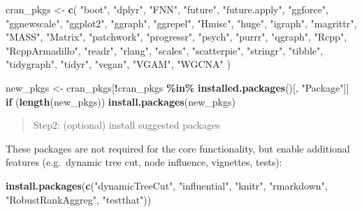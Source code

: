 \documentclass[
]{book}
\newenvironment{Shaded}{\begin{snugshade}}{\end{snugshade}}
\newcommand{\ControlFlowTok}[1]{\textcolor[rgb]{0.13,0.29,0.53}{\textbf{#1}}}
\newcommand{\FunctionTok}[1]{\textcolor[rgb]{0.13,0.29,0.53}{\textbf{#1}}}
\newcommand{\NormalTok}[1]{#1}
\newcommand{\OtherTok}[1]{\textcolor[rgb]{0.56,0.35,0.01}{#1}}
\newcommand{\SpecialCharTok}[1]{\textcolor[rgb]{0.81,0.36,0.00}{\textbf{#1}}}
\newcommand{\StringTok}[1]{\textcolor[rgb]{0.31,0.60,0.02}{#1}}
\begin{document}
\begin{Shaded}
\begin{Highlighting}[]
\NormalTok{cran\_pkgs }\OtherTok{\textless{}{-}} \FunctionTok{c}\NormalTok{(}
  \StringTok{"boot"}\NormalTok{, }\StringTok{"dplyr"}\NormalTok{, }\StringTok{"FNN"}\NormalTok{, }\StringTok{"future"}\NormalTok{, }\StringTok{"future.apply"}\NormalTok{,}
  \StringTok{"ggforce"}\NormalTok{, }\StringTok{"ggnewscale"}\NormalTok{, }\StringTok{"ggplot2"}\NormalTok{, }\StringTok{"ggraph"}\NormalTok{, }\StringTok{"ggrepel"}\NormalTok{,}
  \StringTok{"Hmisc"}\NormalTok{, }\StringTok{"huge"}\NormalTok{, }\StringTok{"igraph"}\NormalTok{, }\StringTok{"magrittr"}\NormalTok{, }\StringTok{"MASS"}\NormalTok{,}
  \StringTok{"Matrix"}\NormalTok{, }\StringTok{"patchwork"}\NormalTok{, }\StringTok{"progressr"}\NormalTok{, }\StringTok{"psych"}\NormalTok{, }\StringTok{"purrr"}\NormalTok{,}
  \StringTok{"qgraph"}\NormalTok{, }\StringTok{"Rcpp"}\NormalTok{, }\StringTok{"RcppArmadillo"}\NormalTok{, }\StringTok{"readr"}\NormalTok{, }\StringTok{"rlang"}\NormalTok{,}
  \StringTok{"scales"}\NormalTok{, }\StringTok{"scatterpie"}\NormalTok{, }\StringTok{"stringr"}\NormalTok{, }\StringTok{"tibble"}\NormalTok{, }\StringTok{"tidygraph"}\NormalTok{,}
  \StringTok{"tidyr"}\NormalTok{, }\StringTok{"vegan"}\NormalTok{, }\StringTok{"VGAM"}\NormalTok{, }\StringTok{"WGCNA"}
\NormalTok{)}

\NormalTok{new\_pkgs }\OtherTok{\textless{}{-}}\NormalTok{ cran\_pkgs[}\SpecialCharTok{!}\NormalTok{cran\_pkgs }\SpecialCharTok{\%in\%} \FunctionTok{installed.packages}\NormalTok{()[, }\StringTok{"Package"}\NormalTok{]]}
\ControlFlowTok{if}\NormalTok{ (}\FunctionTok{length}\NormalTok{(new\_pkgs)) }\FunctionTok{install.packages}\NormalTok{(new\_pkgs)}
\end{Highlighting}
\end{Shaded}

\begin{quote}
Step2: (optional) install suggested packages
\end{quote}

These packages are not required for the core functionality, but enable additional features (e.g.~dynamic tree cut, node influence, vignettes, tests):

\begin{Shaded}
\begin{Highlighting}[]
\FunctionTok{install.packages}\NormalTok{(}\FunctionTok{c}\NormalTok{(}\StringTok{"dynamicTreeCut"}\NormalTok{, }\StringTok{"influential"}\NormalTok{,}
                   \StringTok{"knitr"}\NormalTok{, }\StringTok{"rmarkdown"}\NormalTok{,}
                   \StringTok{"RobustRankAggreg"}\NormalTok{, }\StringTok{"testthat"}\NormalTok{))}
\end{Highlighting}
\end{Shaded}
\end{document}
